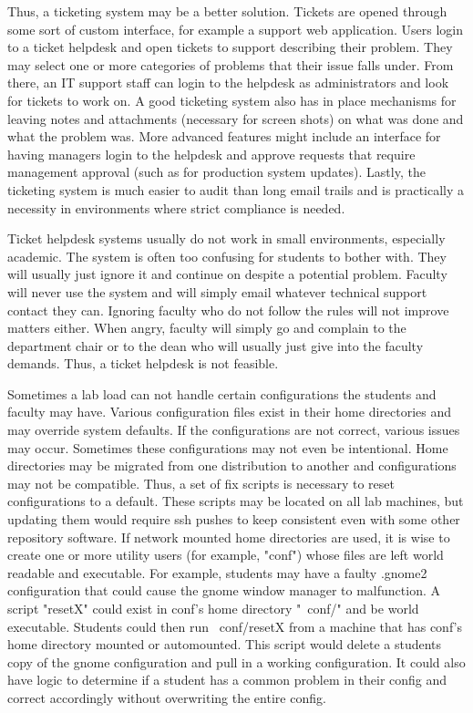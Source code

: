 Thus, a ticketing system may be a better solution.  Tickets are opened through some sort of custom interface, for example a support web application.  Users login to a ticket helpdesk and open tickets to support describing their problem.  They may select one or more categories of problems that their issue falls under.  From there, an IT support staff can login to the helpdesk as administrators and look for tickets to work on.  A good ticketing system also has in place mechanisms for leaving notes and attachments (necessary for screen shots) on what was done and what the problem was.  More advanced features might include an interface for having managers login to the helpdesk and approve requests that require management approval (such as for production system updates).  Lastly, the ticketing system is much easier to audit than long email trails and is practically a necessity in environments where strict compliance is needed.   

Ticket helpdesk systems usually do not work in small environments, especially academic.  The system is often too confusing for students to bother with.  They will usually just ignore it and continue on despite a potential problem.  Faculty will never use the system and will simply email whatever technical support contact they can.  Ignoring faculty who do not follow the rules will not improve matters either.  When angry, faculty will simply go and complain to the department chair or to the dean who will usually just give into the faculty demands.  Thus, a ticket helpdesk is not feasible.  

Sometimes a lab load can not handle certain configurations the students and faculty may have.  Various configuration files exist in their home directories and may override system defaults.  If the configurations are not correct, various issues may occur.  Sometimes these configurations may not even be intentional.  Home directories may be migrated from one distribution to another and configurations may not be compatible.  Thus, a set of fix scripts is necessary to reset configurations to a default.  These scripts may be located on all lab machines, but updating them would require ssh pushes to keep consistent even with some other repository software.  If network mounted home directories are used, it is wise to create one or more utility users (for example, "conf") whose files are left world readable and executable.  For example, students may have a faulty .gnome2 configuration that could cause the gnome window manager to malfunction.  A script "resetX" could exist in conf's home directory "~conf/" and be world executable.  Students could then run ~conf/resetX from a machine that has conf's home directory mounted or automounted.  This script would delete a students copy of the gnome configuration and pull in a working configuration.  It could also have logic to determine if a student has a common problem in their config and correct accordingly without overwriting the entire config.   

